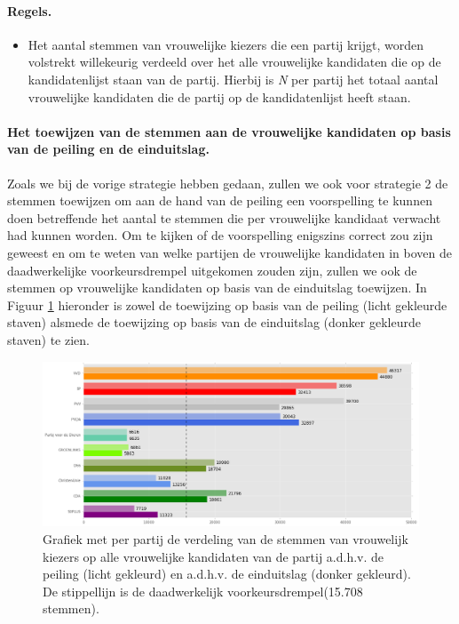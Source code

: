 \paragraph{Regels.}
\begin{itemize}
	\item
Het aantal stemmen van vrouwelijke kiezers die een partij krijgt, worden volstrekt willekeurig verdeeld over het alle vrouwelijke kandidaten die op de kandidatenlijst staan van de partij. Hierbij is \textit{N} per partij het totaal aantal vrouwelijke kandidaten die de partij op de kandidatenlijst heeft staan. 	\\ 	
\end{itemize}	

\paragraph{Het toewijzen van de stemmen aan de vrouwelijke kandidaten op basis van de peiling en de einduitslag.}
Zoals we bij de vorige strategie hebben gedaan, zullen we ook voor strategie 2 de stemmen toewijzen om aan de hand van de peiling een voorspelling te kunnen doen betreffende het aantal te stemmen die per vrouwelijke kandidaat verwacht had kunnen worden. Om te kijken of de voorspelling enigszins correct zou zijn geweest en om te weten van welke partijen de vrouwelijke kandidaten in boven de daadwerkelijke voorkeursdrempel uitgekomen zouden zijn, zullen we ook de stemmen op vrouwelijke kandidaten op basis van de einduitslag toewijzen. In Figuur \ref{fig:stemmenS2V}  hieronder is zowel de toewijzing op basis van de peiling (licht gekleurde staven) alsmede de toewijzing op basis van de einduitslag (donker gekleurde staven) te zien.   



\begin{figure}[H]

	\includegraphics[width=\linewidth]	{stemmen_op_vrouwen_willekeurig_samen.png}

			\caption{Grafiek met per partij de verdeling van de stemmen van vrouwelijk kiezers op alle vrouwelijke kandidaten van de partij a.d.h.v. de peiling (licht gekleurd) en a.d.h.v. de einduitslag (donker gekleurd). De stippellijn is de daadwerkelijk voorkeursdrempel(15.708 stemmen).}

\label{fig:stemmenS2V}
\end{figure}


